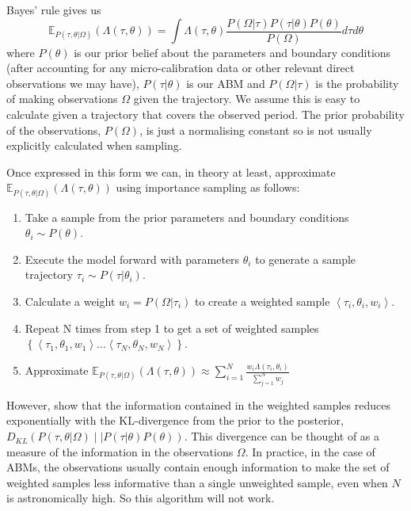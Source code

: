 \documentclass{article}
\begin{document}
Bayes' rule gives us
\begin{equation}
\mathbb{E}_{P(\tau,\theta|\Omega)}(\Lambda(\tau,\theta)) = \int \Lambda(\tau,\theta) \frac{P(\Omega|\tau)P(\tau|\theta)P(\theta)}{P(\Omega)} d\tau d\theta
\label{bayesassimilation}
\end{equation}
where $P(\theta)$ is our prior belief about the parameters and boundary conditions (after accounting for any micro-calibration data or other relevant direct observations we may have), $P(\tau|\theta)$ is our ABM and $P(\Omega|\tau)$ is the probability of making observations $\Omega$ given the trajectory. We assume this is easy to calculate given a trajectory that covers the observed period. The prior probability of the observations, $P(\Omega)$, is just a normalising constant so is not usually explicitly calculated when sampling.

Once expressed in this form we can, in theory at least, approximate $\mathbb{E}_{P(\tau,\theta|\Omega)}(\Lambda(\tau,\theta))$ using importance sampling as follows:
\begin{enumerate}
\item Take a sample from the prior parameters and boundary conditions $\theta_i \sim P(\theta)$.
\item Execute the model forward with parameters $\theta_i$ to generate a sample trajectory $\tau_{i} \sim P(\tau|\theta_i)$.
\item Calculate a weight $w_i = P(\Omega|\tau_i)$ to create a weighted sample $\left<\tau_{i},\theta_i, w_i\right>$.
\item Repeat  N times from step 1 to get a set of weighted samples $\left\{\left<\tau_1,\theta_1,w_1\right> \dots \left<\tau_N,\theta_N,w_N\right> \right\}$.
\item Approximate $\mathbb{E}_{P(\tau,\theta|\Omega)}(\Lambda(\tau,\theta)) \approx \sum_{i=1}^N \frac{w_i\Lambda(\tau_i,\theta_i) }{\sum_{j=1}^Nw_j}$
\end{enumerate}

However, \citet{chatterjee2018sample} show that the information contained in the weighted samples reduces exponentially with the KL-divergence from the prior to the posterior, $D_{KL}\left(P(\tau,\theta|\Omega) \mid\mid P(\tau|\theta)P(\theta) \right)$. This divergence can be thought of as a measure of the information in the observations $\Omega$. In practice, in the case of ABMs, the observations usually contain enough information to make the set of weighted samples less informative than a single unweighted sample, even when $N$ is astronomically high. So this algorithm will not work.
\end{document}
